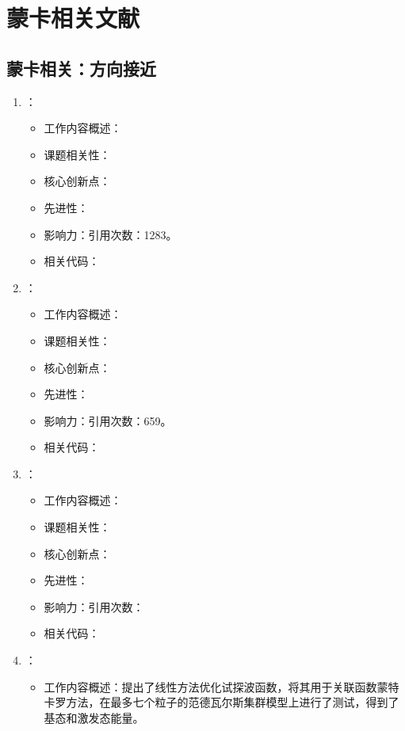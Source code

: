 \chapter{蒙卡相关文献}
\section{蒙卡相关：方向接近}
    \begin{enumerate}
        \item \citet{reynolds1982fixed}：
        \begin{itemize}
            \item 工作内容概述：
            \item 课题相关性：
            \item 核心创新点：
            \item 先进性：
            \item 影响力：引用次数：1283。
            \item 相关代码：
        \end{itemize}
        \item \citet{umrigar1993diffusion}：
            \begin{itemize}
                \item 工作内容概述：
                \item 课题相关性：
                \item 核心创新点：
                \item 先进性：
                \item 影响力：引用次数：659。
                \item 相关代码：
            \end{itemize}
        \item \citet{finnila1994quantum}：
            \begin{itemize}
                \item 工作内容概述：
                \item 课题相关性：
                \item 核心创新点：
                \item 先进性：
                \item 影响力：引用次数：
                \item 相关代码：
            \end{itemize}
        \item \citet{nightingale2001optimization}：
        \begin{itemize}
            \item 工作内容概述：提出了线性方法优化试探波函数，将其用于关联函数蒙特卡罗方法，在最多七个粒子的范德瓦尔斯集群模型上进行了测试，得到了基态和激发态能量。

\end{itemize}
\end{enumerate}
